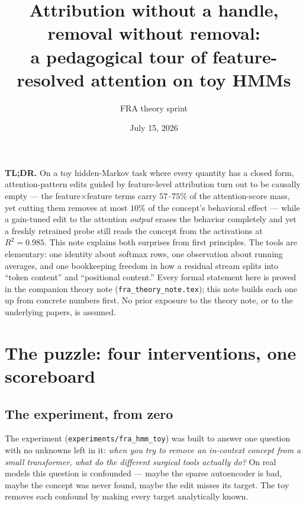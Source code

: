 \documentclass{article}
\title{Attribution without a handle, removal without removal:\\ a pedagogical tour of feature-resolved attention on toy HMMs}
\author{FRA theory sprint}
\date{July 15, 2026}
\begin{document}
\maketitle

\textbf{TL;DR.} On a toy hidden-Markov task where every quantity has a closed form, attention-pattern edits guided by feature-level attribution turn out to be causally empty --- the feature$\times$feature terms carry $57$--$75\%$ of the attention-score mass, yet cutting them removes at most $10\%$ of the concept's behavioral effect --- while a gain-tuned edit to the attention \emph{output} erases the behavior completely and yet a freshly retrained probe still reads the concept from the activations at $R^2 = 0.985$. This note explains both surprises from first principles. The tools are elementary: one identity about softmax rows, one observation about running averages, and one bookkeeping freedom in how a residual stream splits into ``token content'' and ``positional content.'' Every formal statement here is proved in the companion theory note (\texttt{fra\_theory\_note.tex}); this note builds each one up from concrete numbers first. No prior exposure to the theory note, or to the underlying papers, is assumed.

\tableofcontents

\section{The puzzle: four interventions, one scoreboard}\label{sec:puzzle}

\subsection{The experiment, from zero}

The experiment (\texttt{experiments/fra\_hmm\_toy}) was built to answer one question with no unknowns left in it: \emph{when you try to remove an in-context concept from a small transformer, what do the different surgical tools actually do?} On real models this question is confounded --- maybe the sparse autoencoder is bad, maybe the concept was never found, maybe the edit misses its target. The toy removes each confound by making every target analytically known.
\end{document}
